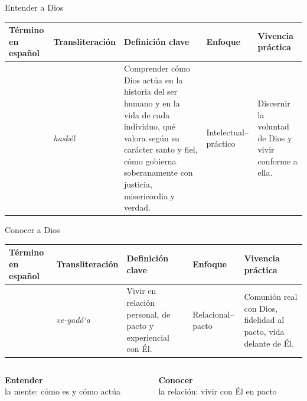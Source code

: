 \begin{frame}{Entender a Dios}
\scriptsize
\begin{tabular}{@{}P{1.6cm} P{1.5cm} P{3.8cm} P{1.4cm} P{2.2cm}@{}}
\toprule
\textbf{Término en español} & \textbf{Transliteración} & \textbf{Definición clave} & \textbf{Enfoque} & \textbf{Vivencia práctica} \\ \midrule
{} & \emph{haskél} & Comprender cómo Dios actúa en la historia del ser humano y en la vida de cada individuo, qué valora según su carácter santo y fiel, cómo gobierna soberanamente con justicia, misericordia y verdad. & Intelectual–práctico & Discernir la voluntad de Dios y vivir conforme a ella. \\ \bottomrule
\end{tabular}
\end{frame}

\begin{frame}{Conocer a Dios}
\scriptsize
\begin{tabular}{@{}P{1.6cm} P{1.5cm} P{3.8cm} P{1.4cm} P{2.2cm}@{}}
\toprule
\textbf{Término en español} & \textbf{Transliteración} & \textbf{Definición clave} & \textbf{Enfoque} & \textbf{Vivencia práctica} \\ \midrule
{} & \emph{ve-yadó‘a} & Vivir en relación personal, de pacto y experiencial con Él. & Relacional–pacto & Comunión real con Dios, fidelidad al pacto, vida delante de Él. \\ \bottomrule
\end{tabular}
\vspace{12pt}

\begin{columns}[c,onlytextwidth]
\begin{column}{0.48\textwidth}
\begin{tcolorbox}[colback=azulcl,colframe=azulp,boxrule=0.8pt,arc=3pt,fontupper=\small,halign=center]
\textbf{Entender}\\ la mente: cómo es y cómo actúa
\end{tcolorbox}
\end{column}
\begin{column}{0.48\textwidth}
\begin{tcolorbox}[colback=azulcl,colframe=azulp,boxrule=0.8pt,arc=3pt,fontupper=\small,halign=center]
\textbf{Conocer}\\ la relación: vivir con Él en pacto
\end{tcolorbox}
\end{column}
\end{columns}
\end{frame}

